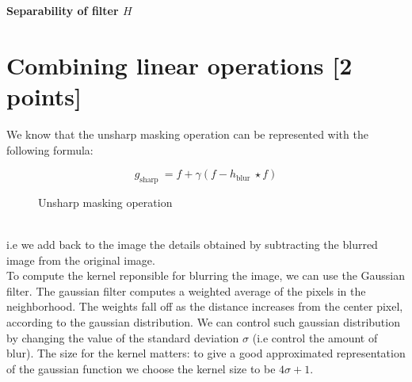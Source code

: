 \documentclass[tikz,14pt,fleqn]{article}
\begin{document}
\textbf{Separability of filter $H$}\\


\section{Combining linear operations [2 points]}
We know that the unsharp masking operation can be represented with the following formula:
\begin{figure}[h!]
$$g_{\text {sharp }}=f+\gamma\left(f-h_{\text {blur }} \star f\right)$$
\caption{Unsharp masking operation}
\label{fig:2.1unsharpformula}
\end{figure}\\
i.e we add back to the image the details obtained by subtracting the blurred image from the original image.\\

To compute the kernel reponsible for blurring the image, we can use the Gaussian filter. The gaussian filter computes a weighted average of the pixels in the neighborhood. The weights fall off as the distance increases from the center pixel, according to the gaussian distribution. We can control such gaussian distribution by changing the value of the standard deviation $\sigma$ (i.e control the amount of blur). The size for the kernel matters: to give a good approximated representation of the gaussian function we choose the kernel size to be $4\sigma +1$.\\
\end{document}
